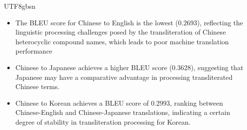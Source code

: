 \documentclass[conference]{IEEEtran}
\begin{document}
\begin{CJK*}{UTF8}{gbsn}
\begin{itemize}
\begin{itemize}
\item The BLEU score for Chinese to English is the lowest (0.2693), reflecting the linguistic processing challenges posed by the transliteration of Chinese heterocyclic compound names, which leads to poor machine translation performance
\item Chinese to Japanese achieves a higher BLEU score (0.3628), suggesting that Japanese may have a comparative advantage in processing transliterated Chinese terms.
\item Chinese to Korean achieves a BLEU score of 0.2993, ranking between Chinese-English and Chinese-Japanese translations, indicating a certain degree of stability in transliteration processing for Korean. 
\end{itemize}
\end{itemize}






\end{CJK*}
\end{document}
